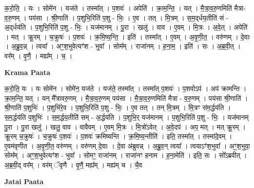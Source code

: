 \documentclass[17pt]{extarticle}
\begin{document}
क॒रो॒ति॒ । यः । सोमे॑न । यज॑ते । तस्मा᳚त् । प॒शवः॑ । अपेति॑ । क्रा॒म॒न्ति॒ । यत् । मै॒त्रा॒व॒रु॒णमिति॑ मैत्रा-व॒रु॒णम् । पय॑सा । श्री॒णाति॑ । प॒शुभि॒रिति॑ प॒शु - भिः॒ । ए॒व । तत् । मि॒त्रम् । स॒म॒द्‌र्धय॒तीति॑ सं - अ॒द्‌र्धय॑ति । प॒शुभि॒रिति॑ प॒शु - भिः॒ । यज॑मानम् । पु॒रा । खलु॑ । वाव । ए॒वम् । मि॒त्रः । अ॒वे॒त् । अपेति॑ । मत् । क्रू॒रम् । च॒क्रुषः॑ । प॒शवः॑ । क्र॒मि॒ष्य॒न्ति॒ । इति॑ । तस्मा᳚त् । ए॒वम् । अ॒वृ॒णी॒त॒ । वरु॑णम् । दे॒वाः । अ॒ब्रु॒व॒न्न् । त्वया᳚ । अꣳ॒॒श॒भुवेत्यꣳ॑श - भुवा᳚ । सोम᳚म् । राजा॑नम् । ह॒ना॒म॒ । इति॑ । सः । अ॒ब्र॒वी॒त् । वर᳚म् । वृ॒णै॒ । मह्य᳚म् । च॒ ।  \newline


\textbf{Krama Paata} \newline

क॒रो॒ति॒ यः । यः सोमे॑न । सोमे॑न॒ यज॑ते । यज॑ते॒ तस्मा᳚त् । तस्मा᳚त् प॒शवः॑ । प॒शवोऽप॑ । अप॑ क्रामन्ति । क्रा॒म॒न्ति॒ यत् । यन् मै᳚त्रावरु॒णम् । मै॒त्रा॒व॒रु॒णम् पय॑सा । मै॒त्रा॒व॒रु॒णमिति॑ मैत्रा - व॒रु॒णम् । पय॑सा श्री॒णाति॑ । श्री॒णाति॑ प॒शुभिः॑ । प॒शुभि॑रे॒व । प॒शुभि॒रिति॑ प॒शु - भिः॒ । ए॒व तत् । तन् मि॒त्रम् । मि॒त्रꣳ स॑म॒र्द्धय॑ति । स॒म॒र्द्धय॑ति प॒शुभिः॑ । स॒म॒र्द्धय॒तीति॑ सम् - अ॒र्द्धय॑ति । प॒शुभि॒र् यज॑मानम् । प॒शुभि॒रिति॑ प॒शु - भिः॒ । यज॑मानम् पु॒रा । पु॒रा खलु॑ । खलु॒ वाव । वावैवम् । ए॒वम् मि॒त्रः । मि॒त्रो॑ऽवेत् । अ॒वे॒दप॑ । अप॒ मत् । मत् क्रू॒रम् । क्रू॒रम् च॒क्रुषः॑ । च॒क्रुषः॑ प॒शवः॑ । प॒शवः॑ क्रमिष्यन्ति । क्र॒मि॒ष्य॒न्तीति॑ । इति॒ तस्मा᳚त् । तस्मा॑दे॒वम् । ए॒वम॑वृणीत । अ॒वृ॒णी॒त॒ वरु॑णम् । वरु॑णम् दे॒वाः । दे॒वा अ॑ब्रुवन्न् । अ॒ब्रु॒व॒न् त्वया᳚ । त्वयाऽꣳ॑श॒भुवा᳚ । अꣳ॒॒श॒भुवा॒ सोम᳚म् । अꣳ॒॒श॒भुवेत्यꣳ॑श - भुवा᳚ । सोमꣳ॒॒ राजा॑नम् । राजा॑नꣳ हनाम । ह॒ना॒मेति॑ । इति॒ सः । सो᳚ऽब्रवीत् । अ॒ब्र॒वी॒द् वर᳚म् । वर॑म् ॅवृणै । वृ॒णै॒ मह्य᳚म् । मह्य॑म् च । चै॒व \newline

\textbf{Jatai Paata} \newline
\end{document}
